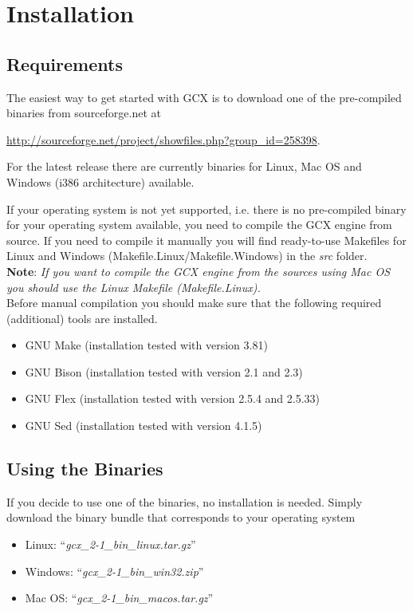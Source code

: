 \section{Installation}

\subsection{Requirements}
The easiest way to get started with GCX is to download one of the pre-compiled binaries
from sourceforge.net at
\begin{center}
\href{http://sourceforge.net/project/showfiles.php?group_id=258398}{http://sourceforge.net/project/showfiles.php?group\_id=258398}.
\end{center}

\noindent For the latest release there are currently binaries for Linux, Mac OS and Windows (i386
architecture) available.

If your operating system is not yet supported, i.e. there is no pre-compiled binary for your operating system available, you need to compile the GCX engine from source. If you need to compile it manually you will find ready-to-use Makefiles for Linux and Windows (Makefile.Linux/Makefile.Windows) in the \emph{src} folder. \\

\noindent \textbf{Note}: \emph{If you want to compile the GCX engine from the sources using Mac OS you should use the Linux Makefile (Makefile.Linux).} \\

\noindent Before manual compilation you should make sure that the following required (additional) tools are installed.
\begin{itemize}
  \setlength{\itemsep}{0pt}
  \item GNU Make  (installation tested with version 3.81)
  \item GNU Bison (installation tested with version 2.1 and 2.3)
  \item GNU Flex  (installation tested with version 2.5.4 and 2.5.33)
  \item GNU Sed   (installation tested with version 4.1.5)
\end{itemize}

\clearpage

\subsection{Using the Binaries}
If you decide to use one of the binaries, no installation is needed. Simply download the binary bundle that corresponds to your operating system
\begin{itemize}
  \setlength{\itemsep}{0pt}
  \item Linux: \enquote{\emph{gcx\_2-1\_bin\_linux.tar.gz}}
  \item Windows: \enquote{\emph{gcx\_2-1\_bin\_win32.zip}}
  \item Mac OS: \enquote{\emph{gcx\_2-1\_bin\_macos.tar.gz}}
\end{itemize}

